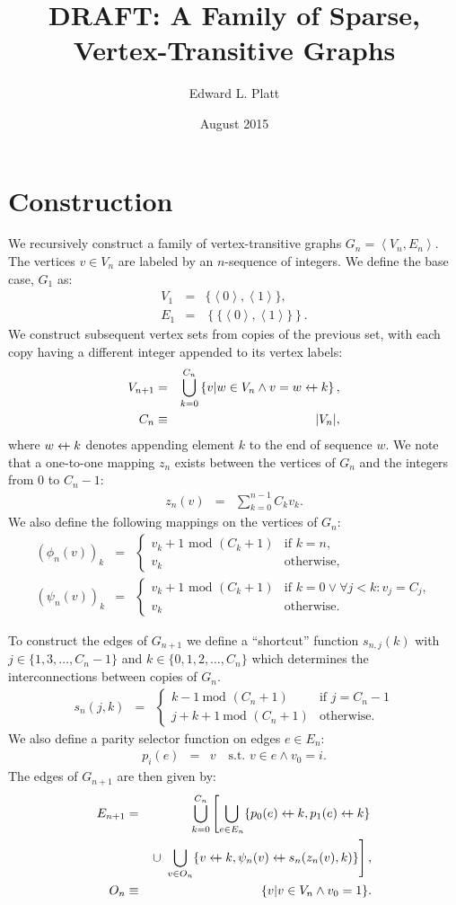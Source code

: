 \documentclass{article}
\title{DRAFT: A Family of Sparse, Vertex-Transitive Graphs}
\author{Edward L. Platt}
\date{August 2015}
\newcommand{\la}{\left\langle}
\newcommand{\ra}{\right\rangle}
\newcommand{\beq}{\begin{eqnarray}}
\newcommand{\eeq}{\end{eqnarray}}
\newcommand{\append}{\leftarrow{\mkern-18mu}{+}\:}
\begin{document}
\maketitle

\section{Construction}

We recursively construct a family of vertex-transitive graphs
$G_n = \la V_n, E_n \ra$.
The vertices $v \in V_n$ are labeled by an $n$-sequence of integers.
We define the base case, $G_1$ as:
\beq
V_1 &=& \{\la{0}\ra,\la{1}\ra\}, \\
E_1 &=& \left\{\{\la{0}\ra,\la{1}\ra\}\right\}.
\eeq
We construct subsequent vertex sets from copies of the previous set,
with each copy having a different integer appended to its vertex labels:
\beq
\label{eq:vn}
V_{n+1} &=& \bigcup_{k = 0}^{C_n}
\left\{ v | w \in V_n \land v = w \append k \right\},
\\
C_n &\equiv& |V_n|,
\eeq
where $w \append k$ denotes appending element $k$ to the end of sequence $w$.
We note that a one-to-one mapping $z_n$ exists between the vertices of $G_n$ and the
integers from $0$ to $C_n - 1$:
\beq
z_n(v) &=& \sum_{k=0}^{n-1} C_k v_k.
\eeq
We also define the following mappings on the vertices of $G_n$:
\beq
(\phi_n(v))_k
&=&
\begin{cases}
v_k + 1 \mbox{ mod } (C_k + 1) & \mbox{if } k = n,
\\
v_k & \mbox{otherwise},
\end{cases}
\\
(\psi_n(v))_k
&=&
\begin{cases}
v_k + 1 \mbox{ mod } (C_k + 1)
& \mbox{if } k = 0 \lor \forall j < k: v_j = C_j, \\
v_k & \mbox{otherwise}.
\end{cases}
\eeq

To construct the edges of $G_{n+1}$ we define a ``shortcut'' function $s_{n,j}(k)$
with $j \in \{1, 3, \ldots, C_n - 1\}$ and $k \in \{0, 1, 2, \ldots, C_n\}$ which
determines the interconnections between copies of $G_n$.
\beq
s_{n}(j, k)
&=&
\begin{cases}
k - 1 \ \mbox{mod } (C_n + 1)
&
\mbox{if } j = C_n - 1
\\
j + k + 1 \ \mbox{mod } (C_n + 1)
&
\mbox{otherwise}.
\end{cases}
\eeq
We also define a parity selector function on edges $e \in E_n$:
\beq
p_i(e)
&=&
v \quad \mbox{s.t. } v \in e \land v_0 = i.
\eeq
The edges of $G_{n+1}$ are then given by:
\beq
\label{eq:edges}
E_{n+1}
&=&
\bigcup_{k=0}^{C_n}
\left[
\bigcup_{e \in E_n} \{ p_0(e) \append k, p_1(e) \append k\}
\right.
\\ & &
\left.
\cup \ 
\bigcup_{v \in O_n} \{ v \append k, \psi_n(v) \append s_n(z_n(v), k) \}
\right],
\\
O_n &\equiv& \{v | v \in V_n \land v_0 = 1 \}.
\eeq
\end{document}
